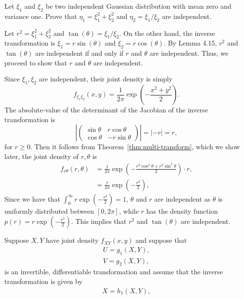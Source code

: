 \begin{problem}{8}
Let $\xi_1$ and $\xi_2$ be two independent Gaussian distribution with mean zero and variance one. Prove that $\eta_1 = \xi_1^2 + \xi_2^2$ and $\eta_2 = \xi_1/\xi_2$ are independent. 
\end{problem}
\begin{solution}
    Let $r^2 = \xi_1^2 + \xi_2^2$ and $\tan(\theta) = \xi_1/\xi_2$. On the other hand, the inverse transformation is $\xi_1 = r\sin(\theta)$ and $\xi_2 = r\cos(\theta)$. By Lemma 4.15, $r^2$ and $\tan(\theta)$ are independent if and only if $r$ and $\theta$ are independent. Thus, we proceed to show that $r$ and $\theta$ are independent. 

    Since $\xi_1,\xi_2$ are independent, their joint density is simply \[
        f_{\xi_1\xi_2}(x,y) = \frac{1}{2\pi} \exp\left(-\frac{x^2 + y^2}{2}\right).
    \]
    The absolute-value of the determinant of the Jacobian of the inverse transformation is \[
    \left| \begin{pmatrix} \sin\theta & r\cos\theta \\ \cos\theta & -r\sin\theta \end{pmatrix}\right| = |-r| = r,
    \]
    for $r \geq 0$. Then it follows from Theorem~\ref{thm:multi-transform}, which we show later, the joint density of $r,\theta$ is 
    \begin{align*}
        f_{r\theta} (r,\theta) &= \frac{1}{2\pi} \exp{\left(-\frac{r^2\cos^2\theta + r^2 \sin^2\theta}{2}\right)} \cdot r, \\
        &= \frac{r}{2\pi}\exp{\left(-\frac{r^2}{2}\right)}, \tag{for $r\geq 0$}
    \end{align*}
    Since we have that $\int_0^\infty r\exp\left(-\frac{r^2}{2}\right) = 1$, $\theta$ and $r$ are independent as $\theta$ is uniformly distributed between $[0,2\pi]$, while $r$ has the density function $p(r) = r\exp\left(-\frac{r^2}{2}\right)$. This implies that $r^2$ and $\tan(\theta)$ are independent.
    \begin{theorem}\label{thm:multi-transform}
        Suppose $X,Y$ have joint density $f_{XY}(x,y)$ and suppose that 
        \begin{align*}
            U = g_1(X,Y), \\
            V = g_2(X,Y),
        \end{align*}
        is an invertible, differentiable transformation and assume that the inverse transformation is given by 
        \begin{align*}
            X = h_1(X,Y), \\

\end{align*}
\end{theorem}
\end{solution}
